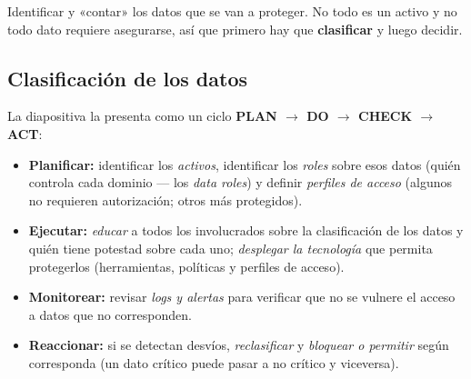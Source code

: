 \documentclass[11pt,a4paper]{article}
\begin{document}
Identificar y «contar» los datos que se van a proteger. No todo es un activo y no todo dato
requiere asegurarse, así que primero hay que \textbf{clasificar} y luego decidir.

\subsection{Clasificación de los datos}

La diapositiva la presenta como un ciclo \textbf{PLAN $\to$ DO $\to$ CHECK $\to$ ACT}:

\begin{center}
\end{center}

\begin{itemize}[leftmargin=1.4em,itemsep=2pt]
  \item \textbf{Planificar:} identificar los \emph{activos}, identificar los \emph{roles}
        sobre esos datos (quién controla cada dominio — los \emph{data roles}) y definir
        \emph{perfiles de acceso} (algunos no requieren autorización; otros más protegidos).
  \item \textbf{Ejecutar:} \emph{educar} a todos los involucrados sobre la clasificación de
        los datos y quién tiene potestad sobre cada uno; \emph{desplegar la tecnología} que
        permita protegerlos (herramientas, políticas y perfiles de acceso).
  \item \textbf{Monitorear:} revisar \emph{logs y alertas} para verificar que no se vulnere
        el acceso a datos que no corresponden.
  \item \textbf{Reaccionar:} si se detectan desvíos, \emph{reclasificar} y \emph{bloquear o
        permitir} según corresponda (un dato crítico puede pasar a no crítico y viceversa).
\end{itemize}
\end{document}
